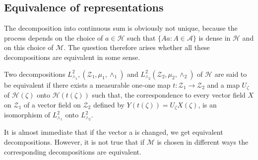 \subsection{Equivalence of
  representations}\pageoriginale\label{partIII-chap2-sec2.6} %

 The decomposition into continuous sum is obviously not unique,
 because the process depends on the choice of  $a \in\mathscr{H}$ such
 that $\{ Aa:A \in \mathcal{A} \}$ is dense in $\mathscr{H}$ and on this
 choice of $\mathscr{M}$. The question therefore arises whether all these
 decompositions are equivalent in some sense. 

\begin{defi*}
 Two decompositions $L^2 _{\wedge_1}, (\mathcal{Z}_1,\mu_1, \wedge_1)$
 and  $L^2 _{\wedge_2} (\mathcal{Z}_2, \mu_2, \wedge_2 ) $ of
 $\mathscr{H}$ are said to be equivalent if there exists a measurable
 one-one map $t : \mathcal{Z}_1\rightarrow \mathcal{Z}_2$ and a map
 $U_\zeta  $ of  $\mathscr{H}(\zeta)$ onto $\mathscr{H}(t(\zeta))$
 such that, the correspondence to every vector field $X$ on
 $\mathcal{Z}_1$ of a vector  field on $\mathcal{Z}_2$ defined  by
 $Y(t(\zeta))=  U_\zeta X (\zeta)$, is an isomorphism of
 $L^2_{\wedge_1}$ onto $L^2_{\wedge_2}$. 
 \end{defi*}

It is almost immediate that if the vector a is changed, we get
equivalent decompositions. However, it is not true that if $\mathscr{M}$ is
chosen  in different ways the corresponding decompositions are
equivalent.  
